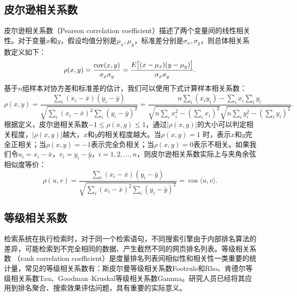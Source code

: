 \subsection{皮尔逊相关系数}
皮尔逊相关系数（Pearson correlation coefficient）描述了两个变量间的线性相关性。对于变量$x$和$y$，假设均值分别是$\mu_x,\mu_y$，标准差分别是$\sigma_x,\sigma_y$，则总体相关系数定义如下：
\begin{equation}\label{eq:pearsoncor}
    \rho(x,y)=\frac{\operatorname{\mathrm{cov}}(x,y)}{\sigma_x\sigma_y}=\frac{E\big[(x-\mu_x)(y-\mu_y)\big]}{\sigma_x\sigma_y}.
\end{equation}
基于$n$组样本对协方差和标准差的估计，我们可以使用下式计算样本相关系数：
\begin{equation}\label{eq:pearsonrho}
    \rho(x,y)=\frac{\sum\limits_i (x_i - \bar x)(y_i - \bar y)}{\sqrt{\sum\limits_i (x_i - \bar x)^2 \sum\limits_i (y_i - \bar y)^2}} = \frac{n\sum\limits_i (x_i y_i) - \sum\limits_i x_i \sum\limits_i y_i}{\sqrt{n\sum\limits_i x_i^2 - (\sum\limits_i x_i)^2}\sqrt{n\sum\limits_i y_i^2 - (\sum\limits_i y_i)^2}}.
\end{equation}
根据定义，皮尔逊相关系数$-1 \le \rho(x,y) \le 1$，通过$|\rho(x,y)|$的大小可以判定相关程度，$|\rho(x,y)|$越大，$x$和$y$的相关程度越大。当$\rho(x,y)=1$ 时，表示$x$和$y$完全正相关；当$\rho(x,y)=-1$表示完全负相关；当$\rho(x,y)=0$表示不相关。如果我们令$u_i=x_i-\bar x$，$v_i=y_i-\bar y$，$i=1,2,\ldots,n$，则皮尔逊相关系数实际上与夹角余弦相似度等价：
\begin{equation}
    \rho(u,v) = \frac{\sum\limits_i (x_i - \bar x)(y_i - \bar y)}{\sqrt{\sum\limits_i (x_i - \bar x)^2 \sum\limits_i (y_i - \bar y)^2}} = \cos\langle u,v\rangle.
\end{equation}

\subsection{等级相关系数}\label{subsec:spearman-and-kendall}
检索系统在执行检索时，对于同一个检索语句，不同搜索引擎由于内部排名算法的差异，可能检索到不完全相同的数据、产生截然不同的网页排名列表。等级相关系数
（rank correlation coefficient）是度量排名列表间相似性和相关性一类重要的统计量，常见的等级相关系数有：斯皮尔曼等级相关系数Footrule和Rho、肯德尔等级相关系数Tau、Goodman--Kruskal等级相关系数Gamma。研究人员已经将其应用到排名聚合、搜索效果评估问题，具有重要的实际意义。


